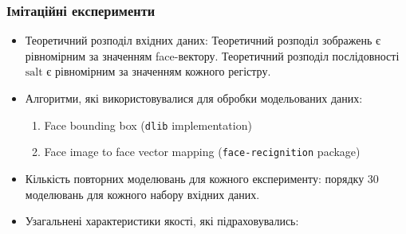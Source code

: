 \documentclass[11pt]{article}
\providecommand{\tightlist}{%
      \setlength{\itemsep}{0pt}\setlength{\parskip}{0pt}}
\begin{document}
    \hypertarget{ux456ux43cux456ux442ux430ux446ux456ux439ux43dux456-ux435ux43aux441ux43fux435ux440ux438ux43cux435ux43dux442ux438}{%
\subsubsection{Імітаційні
експерименти}\label{ux456ux43cux456ux442ux430ux446ux456ux439ux43dux456-ux435ux43aux441ux43fux435ux440ux438ux43cux435ux43dux442ux438}}

\begin{itemize}
\tightlist
\item
  Теоретичний розподіл вхідних даних: Теоретичний розподіл зображень є
  рівномірним за значенням face-вектору. Теоретичний розподіл
  послідовності \(\text{salt}\) є рівномірним за значенням кожного
  регістру.
  \vspace{1ex}
\item
  Алгоритми, які використовувалися для обробки модельованих даних:

  \begin{enumerate}
  \def\labelenumi{\arabic{enumi}.}
  \tightlist
  \vspace{1ex}
  \item
    Face bounding box (\texttt{dlib} implementation)
    \vspace{1ex}
  \item
    Face image to face vector mapping (\texttt{face-recignition}
    package)
    \vspace{1ex}
  \end{enumerate}
\item
  Кількість повторних моделювань для кожного експерименту: порядку 30
  моделювань для кожного набору вхідних даних.
  \vspace{1ex}
\item
  Узагальнені характеристики якості, які підраховувались:
  \vspace{1ex}


\end{itemize}
\end{document}
